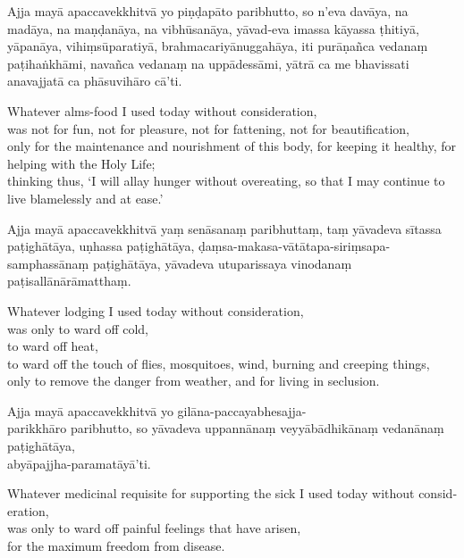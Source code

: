 Ajja mayā apaccavekkhitvā yo piṇḍapāto paribhutto, so n'eva davāya, na madāya, na
maṇḍanāya, na vibhūsanāya, yāvad-eva imassa kāyassa ṭhitiyā, yāpanāya,
vihiṃsūparatiyā, brahmacariyānuggahāya, iti purāṇañca vedanaṃ paṭihaṅkhāmi,
navañca vedanaṃ na uppādessāmi, yātrā ca me bhavissati anavajjatā ca
phāsuvihāro cā'ti.

\begin{english}
  Whatever alms-food I used today without consideration,\\
  was not for fun, not for pleasure, not for fattening, not for beautification,\\
  only for the maintenance and nourishment of this body, for keeping it healthy, for helping with the Holy Life;\\
  thinking thus, `I will allay hunger without overeating, so that I may continue to live blamelessly and at ease.'
\end{english}

Ajja mayā apaccavekkhitvā yaṃ senāsanaṃ paribhuttaṃ, taṃ yāvadeva sītassa
paṭighātāya, uṇhassa paṭighātāya, ḍaṃsa-makasa-vātātapa-siriṃsapa-samphassānaṃ
paṭighātāya, yāvadeva utuparissaya vinodanaṃ paṭisallānārāmatthaṃ.

\begin{english}
  Whatever lodging I used today without consideration,\\
  was only to ward off cold,\\
  to ward off heat,\\
  to ward off the touch of flies, mosquitoes, wind, burning and creeping things,\\
  only to remove the danger from weather, and for living in seclusion.
\end{english}

Ajja mayā apaccavekkhitvā yo gilāna-paccayabhesajja-\\ parikkhāro paribhutto, so
yāvadeva uppannānaṃ veyyābādhikānaṃ vedanānaṃ paṭighātāya,\\
abyāpajjha-paramatāyā'ti.

\begin{english}
  Whatever medicinal requisite for supporting the sick I used today without consideration,\\
  was only to ward off painful feelings that have arisen,\\
  for the maximum freedom from disease.
\end{english}


